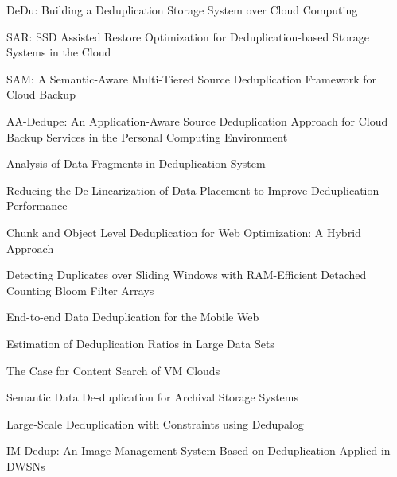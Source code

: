 \documentclass[journal]{IEEEtran}
\begin{document}
%
%
%
\begin{thebibliography}{1}

DeDu: Building a Deduplication Storage System over Cloud Computing
	
SAR: SSD Assisted Restore Optimization for Deduplication-based Storage Systems in the Cloud

SAM: A Semantic-Aware Multi-Tiered Source Deduplication Framework for Cloud Backup

AA-Dedupe: An Application-Aware Source Deduplication Approach for Cloud Backup Services in the Personal Computing Environment

Analysis of Data Fragments in Deduplication System

Reducing the De-Linearization of Data Placement to Improve Deduplication Performance

Chunk and Object Level Deduplication for Web Optimization: A Hybrid Approach

Detecting Duplicates over Sliding Windows with RAM-Efficient Detached Counting Bloom Filter Arrays

End-to-end Data Deduplication for the Mobile Web

Estimation of Deduplication Ratios in Large Data Sets

The Case for Content Search of VM Clouds

Semantic Data De-duplication for Archival Storage Systems

Large-Scale Deduplication with Constraints using Dedupalog

IM-Dedup: An Image Management System Based on Deduplication Applied in DWSNs

\end{thebibliography}
\end{document}
